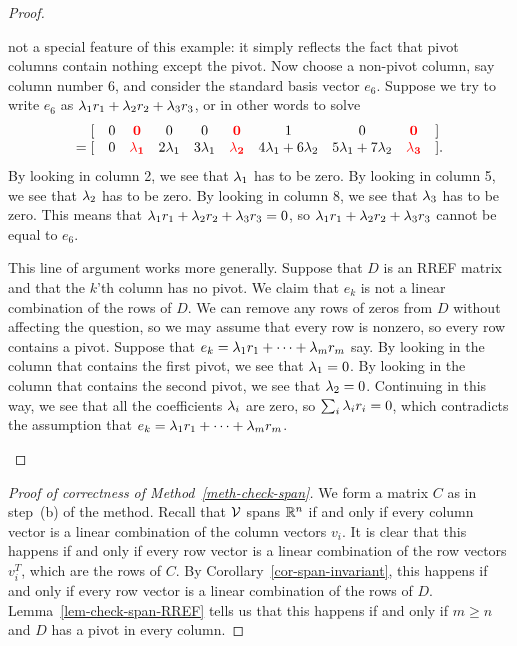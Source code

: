 \documentclass[reqno]{amsart}
\theoremstyle{definition}
\begin{document}
\begin{proof}
\begin{itemize}
   not a special feature of this example: it simply reflects the fact
   that pivot columns contain nothing except the pivot.  Now choose a
   non-pivot column, say column number $6$, and consider the standard
   basis vector $e_6$.  Suppose we try to write $e_6$ as
   $\lambda_1r_1+\lambda_2r_2+\lambda_3r_3$, or in other words to solve
   \[ \begin{array}{rccccccccl}
        [ & 0 & {\color{red}\mathbf{0}} & 0 & 0 &
          {\color{red}\mathbf{0}} & 1 & 0 & {\color{red}\mathbf{0}} & ] \\
       =[ & 0 & {\color{red}\mathbf{\lambda_1}} & 2\lambda_1 & 3\lambda_1 &
           {\color{red}\mathbf{\lambda_2}} & 4\lambda_1+6\lambda_2 &
            5\lambda_1+7\lambda_2 & {\color{red}\mathbf{\lambda_3}} &].
      \end{array}
   \]
   By looking in column 2, we see that
   $\lambda_1$ has to be zero.  By looking in column 5, we see that
   $\lambda_2$ has to be zero.  By looking in column 8, we see that
   $\lambda_3$ has to be zero.  This means that
   $\lambda_1r_1+\lambda_2r_2+\lambda_3r_3=0$, so $\lambda_1r_1+\lambda_2r_2+\lambda_3r_3$
   cannot be equal to $e_6$.

   This line of argument works more generally.  Suppose that $D$ is an
   RREF matrix and that the $k$'th column has no pivot.  We claim that
   $e_k$ is not a linear combination of the rows of $D$.  We can remove
   any rows of zeros from $D$ without affecting the question, so we
   may assume that every row is nonzero, so every row contains a
   pivot.  Suppose that $e_k=\lambda_1r_1+\dotsb+\lambda_mr_m$ say.  By
   looking in the column that contains the first pivot, we see that
   $\lambda_1=0$.  By looking in the column that contains the second
   pivot, we see that $\lambda_2=0$.  Continuing in this way, we see that
   all the coefficients $\lambda_i$ are zero, so $\sum_i\lambda_ir_i=0$, which
   contradicts the assumption that $e_k=\lambda_1r_1+\dotsb+\lambda_mr_m$.
 \end{itemize}
\end{proof}

\begin{proof}[Proof of correctness of Method~\ref{meth-check-span}]
 We form a matrix $C$ as in step~(b) of the method.  Recall that $\mathcal{V}$
 spans ${\mathbb{R}}^n$ if and only if every column vector is a linear
 combination of the column vectors $v_i$.  It is clear that this
 happens if and only if every row vector is a linear combination of
 the row vectors $v_i^T$, which are the rows of $C$.  By
 Corollary~\ref{cor-span-invariant}, this happens if and only if every
 row vector is a linear combination of the rows of $D$.
 Lemma~\ref{lem-check-span-RREF} tells us that this happens if and
 only if $m\geq n$ and $D$ has a pivot in every column.
\end{proof}
\end{document}
